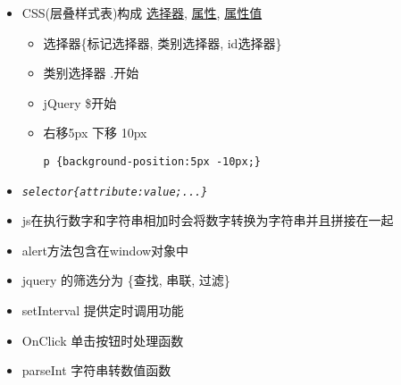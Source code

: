 \documentclass[11pt]{article}
\begin{document}
\begin{itemize}
\item CSS(层叠样式表)构成 \uline{选择器}, \uline{属性}, \uline{属性值}
\begin{itemize}
\item 选择器\{标记选择器, 类别选择器, id选择器\}
\item 类别选择器 .开始
\item jQuery   \$开始
\item 右移5px 下移 10px
\begin{verbatim}
p {background-position:5px -10px;}
\end{verbatim}
\end{itemize}
\item \emph{\texttt{selector\{attribute:value;...\}}}
\item js在执行数字和字符串相加时会将数字转换为字符串并且拼接在一起
\item alert方法包含在window对象中
\item jquery      的筛选分为 \{查找, 串联, 过滤\}
\item setInterval 提供定时调用功能
\item OnClick     单击按钮时处理函数
\item parseInt    字符串转数值函数
\end{itemize}
\end{document}
